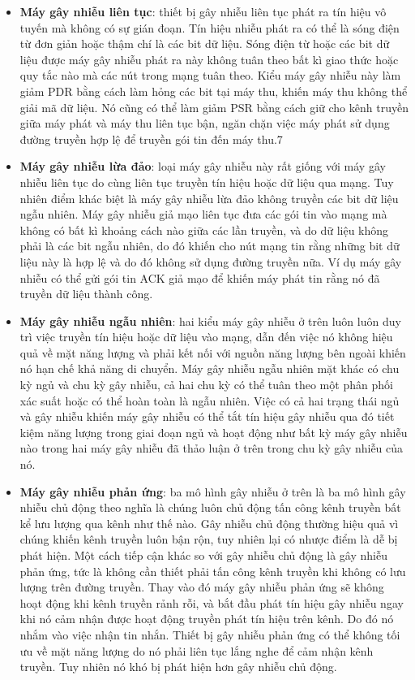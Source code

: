 \documentclass{uetgraduation}
\begin{document}
\begin{itemize}
    \item \textbf{Máy gây nhiễu liên tục}: thiết bị gây nhiễu liên tục phát ra tín hiệu vô tuyến mà không có sự gián đoạn. Tín hiệu nhiễu phát ra có thể 
    là sóng điện từ đơn giản hoặc thậm chí là các bit dữ liệu. Sóng điện từ hoặc các bit dữ liệu được máy gây nhiễu phát ra này không tuân theo bất kì giao 
    thức hoặc quy tắc nào mà các nút trong mạng tuân theo. Kiểu máy gây nhiễu này làm giảm PDR bằng cách làm hỏng các bit tại máy thu, khiến máy thu không
    thể giải mã dữ liệu. Nó cũng có thể làm giảm PSR bằng cách giữ cho kênh truyền giữa máy phát và máy thu liên tục bận, ngăn chặn việc máy phát sử
    dụng đường truyền hợp lệ để truyền gói tin đến máy thu.7
    \item \textbf{Máy gây nhiễu lừa đảo}: loại máy gây nhiễu này rất giống với máy gây nhiễu liên tục do cùng liên tục truyền tín hiệu hoặc dữ liệu qua mạng.
    Tuy nhiên điểm khác biệt là máy gây nhiễu lừa đảo không truyền các bit dữ liệu ngẫu nhiên. Máy gây nhiễu giả mạo liên tục đưa các gói tin vào mạng mà không
    có bất kì khoảng cách nào giữa các lần truyền, và do dữ liệu không phải là các bit ngẫu nhiên, do đó khiến cho nút mạng tin rằng những bit dữ liệu này là
    hợp lệ và do đó không sử dụng đường truyền nữa. Ví dụ máy gây nhiễu có thể gửi gói tin ACK giả mạo để khiến máy phát tin rằng nó đã truyền dữ liệu thành công.
    \item \textbf{Máy gây nhiễu ngẫu nhiên}: hai kiểu máy gây nhiễu ở trên luôn luôn duy trì việc truyền tín hiệu hoặc dữ liệu vào mạng, dẫn đến việc nó không
    hiệu quả về mặt năng lượng và phải kết nối với nguồn năng lượng bên ngoài khiến nó hạn chế khả năng di chuyển. Máy gây nhiễu ngẫu nhiên mặt khác có chu kỳ ngủ
    và chu kỳ gây nhiễu, cả hai chu kỳ có thể tuân theo một phân phối xác suất hoặc có thể hoàn toàn là ngẫu nhiên. Việc có cả hai trạng thái ngủ và gây nhiễu
    khiến máy gây nhiễu có thể tắt tín hiệu gây nhiễu qua đó tiết kiệm năng lượng trong giai đoạn ngủ và hoạt động như bất kỳ máy gây nhiễu nào trong hai máy gây 
    nhiễu đã thảo luận ở trên trong chu kỳ gây nhiễu của nó.
    \item \textbf{Máy gây nhiễu phản ứng}: ba mô hình gây nhiễu ở trên là ba mô hình gây nhiễu chủ động theo nghĩa là chúng luôn chủ động tấn công kênh truyền
    bất kể lưu lượng qua kênh như thế nào. Gây nhiễu chủ động thường hiệu quả vì chúng khiến kênh truyền luôn bận rộn, tuy nhiên lại có nhược điểm là dễ bị phát
    hiện. Một cách tiếp cận khác so với gây nhiễu chủ động là gây nhiễu phản ứng, tức là không cần thiết phải tấn công kênh truyền khi không có lưu lượng trên đường
    truyền. Thay vào đó máy gây nhiễu phản ứng sẽ không hoạt động khi kênh truyền rảnh rỗi, và bắt đầu phát tín hiệu gây nhiễu ngay khi nó cảm nhận được hoạt động
    truyền phát tín hiệu trên kênh. Do đó nó nhắm vào việc nhận tin nhắn. Thiết bị gây nhiễu phản ứng có thể không tối ưu về mặt năng lượng do nó phải liên tục lắng
    nghe để cảm nhận kênh truyền. Tuy nhiên nó khó bị phát hiện hơn gây nhiễu chủ động.
\end{itemize}
\end{document}
